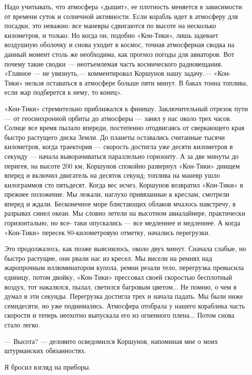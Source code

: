 \documentclass[11pt,a4paper,oneside]{article}
\begin{document}
Надо учитывать, что атмосфера «дышит», ее плотность меняется в зависимости от времени суток и солнечной активности. Если корабль идет в атмосферу для посадки, это неважно: все маневры сдвигаются по высоте на несколько километров, и только. Но когда он, подобно «Кон-Тики», лишь задевает воздушную оболочку и снова уходит в космос, точная атмосферная сводка на данный момент столь же необходима, как прогноз погоды для авиаторов. Вот почему такие сводки — неотъемлемая часть космического радиовещания. «Главное — не увязнуть,— комментировал Коршунов нашу задачу.— «Кон-Тики» нельзя оставаться в атмосфере больше пяти минут. В баках тонна топлива, если жар подберется к нему, то конец».

«Кон-Тики» стремительно приближался к финишу. Заключительный отрезок пути — от геосинхронной орбиты до атмосферы — занял у нас около трех часов. Солнце все время пылало впереди, постепенно отодвигаясь от сверкающего края быстро растущего диска Земли. До планеты оставались считанные тысячи километров, когда траектория — скорость достигла уже десяти километров в секунду — начала выворачиваться параллельно горизонту. А за две минуты до перигея, на высоте 200 км, Коршунов спокойно развернул «Кон-Тики» днищем вперед и включил двигатель на десяток секунд; топлива на маневр ушло килограммов сто пятьдесят. Когда вес исчез, Коршунов возвратил «Кон-Тики» в прежнее положение. Мы лежали, наглухо привязанные к креслам, смотрели вперед и ждали. Бесконечное море блистающих облаков мчалось навстречу, в разрывах синел океан. Мы словно летели на высотном авиалайнере, практически горизонтально, но все- таки опускались — все медленнее и медленнее. А когда «Кон-Тики» пересек 80-километровую отметку, начались перегрузки.

Это продолжалось, как позже выяснилось, около двух минут. Сначала слабые, но быстро растущие, они рвали нас из кресел. Мы висели на ремнях над жаропрочным иллюминатором купола, ремни резали тело, перегрузка превысила единицу, потом двойку, «Кон-Тики» прессовал своей скоростью бесплотный воздух, тот накалялся, пылал, светился багровым цветом... Не помню, о чем я думал в эти секунды. Перегрузка достигла трех и начала падать. Мы были ниже семидесяти, но уже поднимались. Атмосфера отобрала у нашего кораблика часть скорости и теперь неохотно выпускала его из огненного плена... Потом снова стало легко.

— Высота? — деловито осведомился Коршунов, напоминая мне о моих штурманских обязанностях.

Я бросил взгляд на приборы.
\end{document}
